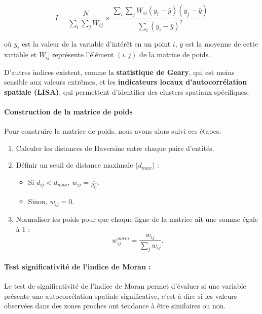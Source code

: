 \documentclass[
]{article}
\providecommand{\tightlist}{%
  \setlength{\itemsep}{0pt}\setlength{\parskip}{0pt}}
\begin{document}
\[
I = \frac{N}{\sum_{i} \sum_{j} W_{ij}} \times \frac{\sum_{i} \sum_{j} W_{ij} (y_i - \bar{y})(y_j - \bar{y})}{\sum_{i} (y_i - \bar{y})^2}
\]

où \(y_i\) est la valeur de la variable d'intérêt en un point \(i\),
\(\bar{y}\) est la moyenne de cette variable et \(W_{ij}\) représente
l'élément \((i, j)\) de la matrice de poids.

D'autres indices existent, comme la \textbf{statistique de Geary}, qui
est moins sensible aux valeurs extrêmes, et les
\textbf{indicateurs locaux d'autocorrélation spatiale (LISA)}, qui
permettent d'identifier des clusters spatiaux spécifiques.

\paragraph{Construction de la matrice de
poids}\label{construction-de-la-matrice-de-poids}

\hfill\break
Pour construire la matrice de poids, nous avons alors suivi ces
étapes.\\

\begin{enumerate}
\def\labelenumi{\arabic{enumi}.}
\tightlist
\item
  Calculer les distances de Haversine entre chaque paire d'entités.
\item
  Définir un seuil de distance maximale (\(d_{max}\)) :

  \begin{itemize}
  \tightlist
  \item
    Si \(d_{ij} < d_{max}\), \(w_{ij} = \frac{1}{d_{ij}}\).
  \item
    Sinon, \(w_{ij} = 0\).
  \end{itemize}
\item
  Normaliser les poids pour que chaque ligne de la matrice ait une somme
  égale à 1 : \[
   w_{ij}^{norm} = \frac{w_{ij}}{\sum_{j} w_{ij}}.
  \]
\end{enumerate}

\paragraph{Test significativité de l'indice de Moran
:}\label{test-significativituxe9-de-lindice-de-moran}

Le test de significativité de l'indice de Moran permet d'évaluer si une
variable présente une autocorrélation spatiale significative,
c'est-à-dire si les valeurs observées dans des zones proches ont
tendance à être similaires ou non.
\end{document}
